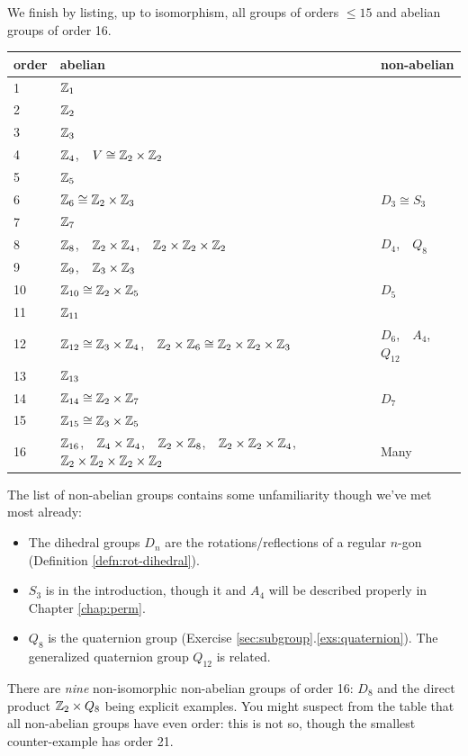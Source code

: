 We finish by listing, up to isomorphism, all groups of orders $\le 15$ and abelian groups of order 16. %
\begin{center}\label{pg:fundabel}
	\begin{tabular}{|l|l|l|}
		\hline
		order & abelian & non-abelian\\
		\hline
		1 & $\mathbb{Z}_1$ & \\
		2 & $\mathbb{Z}_2$ & \\
		3 & $\mathbb{Z}_3$ & \\
		4 & $\mathbb{Z}_4$,\ \ $V\cong\mathbb{Z}_2\times\mathbb{Z}_2$ & \\
		\hline
		5 & $\mathbb{Z}_5$ & \\
		6 & $\mathbb{Z}_6\cong\mathbb{Z}_2\times\mathbb{Z}_3$ & $D_3\cong S_3$\\
		7 & $\mathbb{Z}_7$ & \\
		8 & $\mathbb{Z}_8$,\ \ $\mathbb{Z}_2\times\mathbb{Z}_4$,\ \ $\mathbb{Z}_2\times\mathbb{Z}_2\times\mathbb{Z}_2$ & $D_4$,\ \ $Q_8$\\
		\hline
		9 & $\mathbb{Z}_9$,\ \ $\mathbb{Z}_3\times\mathbb{Z}_3$ & \\
		10 & $\mathbb{Z}_{10}\cong\mathbb{Z}_2\times\mathbb{Z}_5$ & $D_5$\\
		11 & $\mathbb{Z}_{11}$ & \\
		12 & $\mathbb{Z}_{12}\cong\mathbb{Z}_3\times\mathbb{Z}_4$,\ \ $\mathbb{Z}_2\times\mathbb{Z}_6\cong\mathbb{Z}_2\times\mathbb{Z}_2\times\mathbb{Z}_3$ & $D_6$,\ \ $A_4$,\ \ $Q_{12}$\\
		\hline
		13 & $\mathbb{Z}_{13}$ & \\
		14 & $\mathbb{Z}_{14}\cong\mathbb{Z}_2\times\mathbb{Z}_7$ & $D_7$\\
		15 & $\mathbb{Z}_{15}\cong\mathbb{Z}_3\times\mathbb{Z}_5$ & \\
		16 & $\mathbb{Z}_{16}$,\ \ $\mathbb{Z}_4\times\mathbb{Z}_4$,\ \ $\mathbb{Z}_2\times\mathbb{Z}_8$,\ \ $\mathbb{Z}_2\times\mathbb{Z}_2\times\mathbb{Z}_4$,\ \ $\mathbb{Z}_2\times\mathbb{Z}_2\times\mathbb{Z}_2\times\mathbb{Z}_2$ & Many\\
		\hline
	\end{tabular}
\end{center}

The list of non-abelian groups contains some unfamiliarity though we've met most already:
\begin{itemize}\itemsep0pt
  \item The dihedral groups $D_n$ are the rotations/reflections of a regular $n$-gon (Definition \ref{defn:rot-dihedral}).
  \item $S_3$ is in the introduction, though it and $A_4$ will be described properly in Chapter \ref{chap:perm}.
  \item $Q_8$ is the quaternion group (Exercise \ref*{sec:subgroup}.\ref{exs:quaternion}). The generalized quaternion group $Q_{12}$ is related.
\end{itemize}
There are \emph{nine} non-isomorphic non-abelian groups of order 16: $D_8$ and the direct product $\mathbb{Z}_2\times Q_8$ being explicit examples. You might suspect from the table that all non-abelian groups have even order: this is not so, though the smallest counter-example has order 21.


